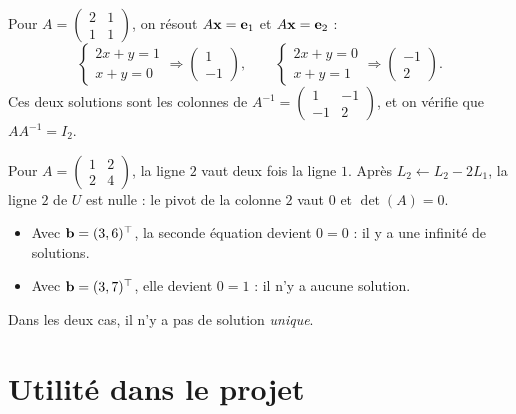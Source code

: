 \begin{example}
Pour $A = \begin{pmatrix} 2 & 1 \\ 1 & 1 \end{pmatrix}$,
on résout $A\mathbf{x} = \mathbf{e}_1$ et
$A\mathbf{x} = \mathbf{e}_2$ :
\[
    \begin{cases} 2x + y = 1 \\ x + y = 0 \end{cases}
    \Rightarrow \begin{pmatrix} 1 \\ -1 \end{pmatrix},
    \qquad
    \begin{cases} 2x + y = 0 \\ x + y = 1 \end{cases}
    \Rightarrow \begin{pmatrix} -1 \\ 2 \end{pmatrix}.
\]
Ces deux solutions sont les colonnes de
$A^{-1} = \begin{pmatrix} 1 & -1 \\ -1 & 2 \end{pmatrix}$,
et on vérifie que $A A^{-1} = I_2$.
\end{example}

\begin{example}
Pour $A = \begin{pmatrix} 1 & 2 \\ 2 & 4 \end{pmatrix}$,
la ligne $2$ vaut deux fois la ligne $1$. Après
$L_2 \leftarrow L_2 - 2L_1$, la ligne $2$ de $U$ est
nulle : le pivot de la colonne $2$ vaut $0$ et
$\det(A) = 0$.
\begin{itemize}
    \item Avec $\mathbf{b} = (3, 6)^\top$, la seconde
          équation devient $0 = 0$ : il y a une
          infinité de solutions.
    \item Avec $\mathbf{b} = (3, 7)^\top$, elle devient
          $0 = 1$ : il n'y a aucune solution.
\end{itemize}
Dans les deux cas, il n'y a pas de solution
\emph{unique}.
\end{example}

\section{Utilité dans le projet}

